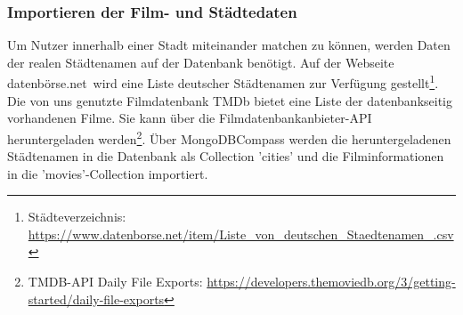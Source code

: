 \subsubsection{Importieren der Film- und Städtedaten}
Um Nutzer innerhalb einer Stadt miteinander matchen zu können, werden Daten der realen Städtenamen auf der Datenbank benötigt. Auf der Webseite \glqq datenbörse.net\grqq \, wird eine Liste deutscher Städtenamen zur Verfügung gestellt\footnote{Städteverzeichnis: \url{https://www.datenborse.net/item/Liste\_von\_deutschen\_Staedtenamen\_.csv}}.
Die von uns genutzte Filmdatenbank TMDb bietet eine Liste der datenbankseitig vorhandenen Filme. Sie kann über die Filmdatenbankanbieter-API heruntergeladen werden\footnote{TMDB-API Daily File Exports: \url{https://developers.themoviedb.org/3/getting-started/daily-file-exports}}. 
Über MongoDBCompass werden die heruntergeladenen Städtenamen in die Datenbank als Collection 'cities' und die Filminformationen in die 'movies'-Collection importiert.

